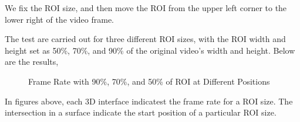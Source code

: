 We fix the ROI size, and then move the ROI from the upper left corner to the lower right of the video frame. 


The test are carried out for three different ROI sizes, with the ROI width and height set as 50\%, 70\%, and 90\% of the original video's width and height. Below are the results,
\begin{figure}
\centering
\caption{Frame Rate with 90\%, 70\%, and 50\% of ROI at Different Positions}
\end{figure}
In figures above, each 3D interface indicatest the frame rate for a ROI size. The intersection in a surface indicate the start position of a particular ROI size. 

